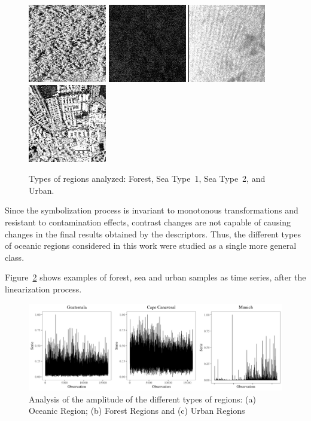\documentclass[paper=letter, fontsize=12pt]{article}
\begin{document}
	\begin{figure}[hbt]
		\centering
		\includegraphics[width=.23\linewidth]{Figures/guatemalaflorest}
		\includegraphics[width=.23\linewidth]{Figures/Cape1}
		\includegraphics[width=.23\linewidth]{Figures/Cape2}
		\includegraphics[width=.23\linewidth]{Figures/munichUrban}	
		\caption{Types of regions analyzed: Forest, Sea Type~1, Sea Type~2, and Urban.}\label{fig:RegionsSAR}
	\end{figure} 
	
	Since the symbolization process is invariant to monotonous transformations and resistant to contamination effects, contrast chan\-ges are not capable of causing changes in the final results obtained by the descriptors.
	Thus, the different types of oceanic regions considered in this work were studied as a single more general class.
	
	Figure~\ref{fig:AmplitudeSAR} shows examples of forest, sea and urban samples as time series, after the linearization process.
	
	\begin{figure}[hbt]
		\includegraphics[width=\columnwidth]{Figures/SAR_signal.pdf}
		\caption{Analysis of the amplitude of the different types of regions: (a) Oceanic Region; (b) Forest Regions and (c) Urban Regions}
		\label{fig:AmplitudeSAR}
	\end{figure} 
	
\end{document}
